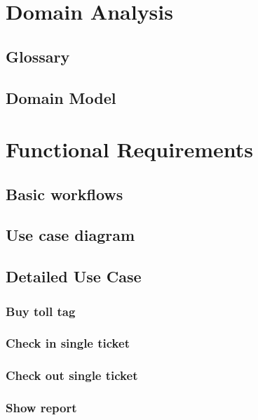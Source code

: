 \section {Domain Analysis}
\subsection{Glossary}


\subsection{Domain Model}


\section{Functional Requirements}
\subsection{Basic workflows}

\subsection{Use case diagram}

\subsection{Detailed Use Case}
\subsubsection{Buy toll tag}

\subsubsection{Check in single ticket}

\subsubsection{Check out single ticket}

\subsubsection{Show report}

